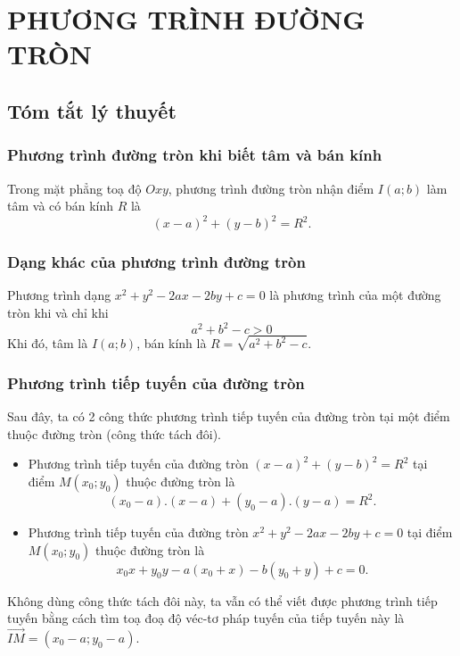 \section{PHƯƠNG TRÌNH ĐƯỜNG TRÒN}
\subsection{Tóm tắt lý thuyết}
\subsubsection{Phương trình đường tròn khi biết tâm và bán kính}
Trong mặt phẳng toạ độ $Oxy$, phương trình đường tròn nhận điểm $I(a;b)$ làm tâm và có bán kính $R$ là
$$(x-a)^2+(y-b)^2=R^2.$$
\subsubsection{Dạng khác của phương trình đường tròn}
Phương trình dạng $x^2+y^2-2ax-2by+c=0$ là phương trình của một đường tròn khi và chỉ khi
$$a^2+b^2-c>0$$
Khi đó, tâm là $I(a;b)$, bán kính là $R=\sqrt{a^2+b^2-c}$.
\subsubsection{Phương trình tiếp tuyến của đường tròn}
Sau đây, ta có 2 công thức phương trình tiếp tuyến của đường tròn tại một điểm thuộc đường tròn (công thức tách đôi).
\begin{itemize}
	\item Phương trình tiếp tuyến của đường tròn $(x-a)^2+(y-b)^2=R^2$ tại điểm $M(x_0;y_0)$ thuộc đường tròn là $$(x_0-a).(x-a)+(y_0-a).(y-a)=R^2.$$
	\item Phương trình tiếp tuyến của đường tròn $x^2+y^2-2ax-2by+c=0$ tại điểm $M(x_0;y_0)$ thuộc đường tròn là $$x_0x+y_0y-a(x_0+x)-b(y_0+y)+c=0.$$
\end{itemize}
Không dùng công thức tách đôi này, ta vẫn có thể viết được phương trình tiếp tuyến bằng cách tìm toạ đoạ độ véc-tơ pháp tuyến của tiếp tuyến này là $\vec{IM}=(x_0-a;y_0-a)$.
